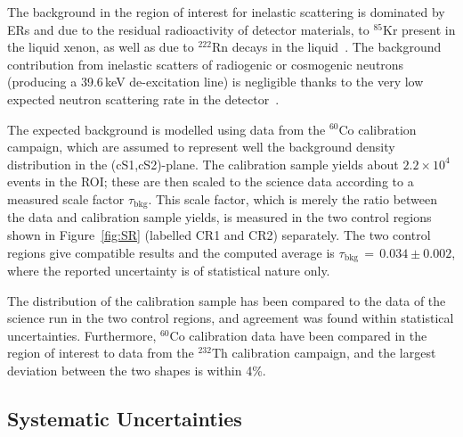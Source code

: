 The background in the region of interest for inelastic scattering is dominated by ERs and due to the residual radioactivity of detector materials, to $^{85}$Kr present in the liquid xenon, as well as due to $^{222}$Rn decays in the liquid~\cite{Aprile:2011vb}. The background contribution from inelastic scatters of radiogenic or cosmogenic neutrons (producing a 39.6\,keV de-excitation line) is negligible thanks to the very low expected neutron scattering rate in the detector~\cite{Aprile:2013tov}.


The expected background is modelled using data from the $^{60}$Co calibration campaign, which are assumed to represent well the background density distribution 
in the (cS1,cS2)-plane. The calibration sample yields  about $2.2\times10^4$ events in the ROI; these are then scaled to the science data according to a measured scale 
factor $\tau_{\text{bkg}}$. This scale factor, which is merely the ratio between the data and calibration sample yields, is measured in the two control regions shown in Figure~\ref{fig:SR} (labelled CR1 and CR2) separately. The two control regions give compatible results and the computed average is $\tau_{\text{bkg}} \, =  \, 0.034 \pm 0.002 $, where the reported uncertainty 
is of statistical nature only.

The distribution of the calibration sample has been compared to the data of the science run in the two control regions,
and agreement was found within statistical uncertainties. Furthermore, $^{60}$Co calibration data have been compared in the region of interest to  
data from the $^{232}$Th calibration campaign, and the largest deviation between the two shapes is within 4\%. 




\subsection{Systematic Uncertainties}

